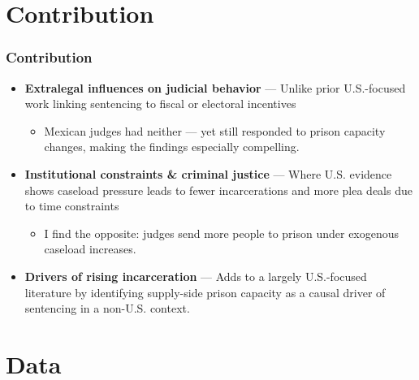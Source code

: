 \documentclass[10pt,aspectratio=169]{beamer}
\begin{document}
\section{Contribution}
\begin{frame}
\frametitle{Contribution}
\small

\begin{itemize}\setlength\itemsep{0.65em}
    \item \textbf{Extralegal influences on judicial behavior} — Unlike prior U.S.-focused work linking sentencing to fiscal or electoral incentives {\footnotesize\color{gray}\citep{Ouss-Incentives, Dippel, Gordon-Judges-Election}}
    \begin{itemize}
        \item \alert{Mexican judges had neither} — yet still responded to prison capacity changes, making the findings especially compelling.
    \end{itemize}
\pause
    \item \textbf{Institutional constraints \& criminal justice} — Where U.S. evidence shows caseload pressure leads to fewer incarcerations and more plea deals due to time constraints {\footnotesize\color{gray}\citep{Yang-Resource-AEJ}}
    \begin{itemize}
        \item \alert{I find the opposite}: judges send more people to prison under exogenous caseload increases.
    \end{itemize}
\pause
    \item \textbf{Drivers of rising incarceration} — Adds to a largely U.S.-focused literature {\footnotesize\color{gray}\citep{Mukherjee-Private, Pfaff2007prison, Galinato-2020}} by identifying supply-side prison capacity as a causal driver of sentencing in a non-U.S. context.
\end{itemize}
\end{frame}

\section{Data}
\end{document}
